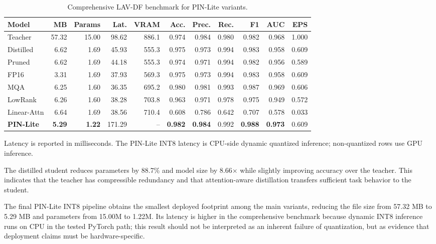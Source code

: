 \documentclass[pdflatex,sn-basic,Numbered]{sn-jnl}
\begin{document}
\begin{table}[t]
\caption{Comprehensive LAV-DF benchmark for PIN-Lite variants.}\label{tab:main-results}
\centering
\tiny
\setlength{\tabcolsep}{1.5pt}
\begin{tabular}{lrrrrrrrrrr}
\toprule
Model & MB & Params & Lat. & VRAM & Acc. & Prec. & Rec. & F1 & AUC & EPS \\
\midrule
Teacher & 57.32 & 15.00 & 98.62 & 886.1 & 0.974 & 0.984 & 0.980 & 0.982 & 0.968 & 1.000 \\
Distilled & 6.62 & 1.69 & 45.93 & 555.3 & 0.975 & 0.973 & 0.994 & 0.983 & 0.958 & 0.609 \\
Pruned & 6.62 & 1.69 & 44.18 & 555.3 & 0.974 & 0.971 & 0.994 & 0.982 & 0.956 & 0.589 \\
FP16 & 3.31 & 1.69 & 37.93 & 569.3 & 0.975 & 0.973 & 0.994 & 0.983 & 0.958 & 0.609 \\
MQA & 6.25 & 1.60 & 36.35 & 695.2 & 0.980 & 0.981 & 0.993 & 0.987 & 0.969 & 0.606 \\
LowRank & 6.26 & 1.60 & 38.28 & 703.8 & 0.963 & 0.971 & 0.978 & 0.975 & 0.949 & 0.572 \\
Linear-Attn & 6.64 & 1.69 & 38.56 & 710.4 & 0.608 & 0.786 & 0.642 & 0.707 & 0.578 & 0.033 \\
\textbf{PIN-Lite} & \textbf{5.29} & \textbf{1.22} & 171.29 & -- & \textbf{0.982} & \textbf{0.984} & 0.992 & \textbf{0.988} & \textbf{0.973} & 0.609 \\
\bottomrule
\end{tabular}
\par\scriptsize\raggedright Latency is reported in milliseconds. The PIN-Lite INT8 latency is CPU-side dynamic quantized inference; non-quantized rows use GPU inference.
\end{table}

The distilled student reduces parameters by 88.7\% and model size by 8.66$\times$ while slightly improving accuracy over the teacher. This indicates that the teacher has compressible redundancy and that attention-aware distillation transfers sufficient task behavior to the student.

The final PIN-Lite INT8 pipeline obtains the smallest deployed footprint among the main variants, reducing the file size from 57.32 MB to 5.29 MB and parameters from 15.00M to 1.22M. Its latency is higher in the comprehensive benchmark because dynamic INT8 inference runs on CPU in the tested PyTorch path; this result should not be interpreted as an inherent failure of quantization, but as evidence that deployment claims must be hardware-specific.
\end{document}
